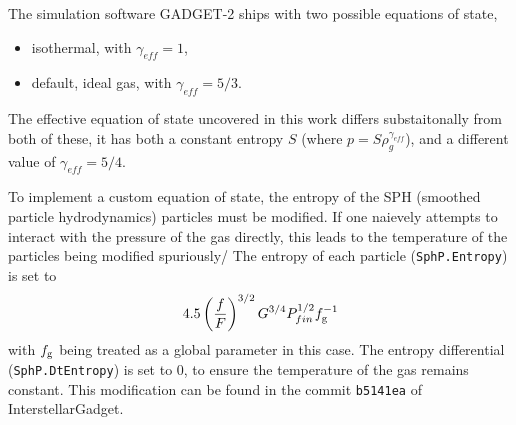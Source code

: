 The simulation software GADGET-2 ships with two possible equations of state,
\begin{itemize}
\item isothermal, with $\gamma_{eff} = 1$,
\item default, ideal gas, with $\gamma_{eff} = 5/3$.
\end{itemize}
The effective equation of state uncovered in this work differs substaitonally from both of these, it has both a constant entropy $S$ (where $p = S\rho_g^{\gamma_{eff}}$), and a different value of $\gamma_{eff} = 5/4$.

To implement a custom equation of state, the entropy of the SPH (smoothed particle hydrodynamics) particles must be modified.
If one naievely attempts to interact with the pressure of the gas directly, this leads to the temperature of the particles being modified spuriously/
The entropy of each particle ({\tt SphP.Entropy}) is set to
$$
4.5\left(\frac{f}{F}\right)^{{3/2}} G^{{3/4}} P_{fin}^{{1/2}} f_\mathrm{g}^{-1}
$$
with $f_\mathrm{g}$ being treated as a global parameter in this case.
The entropy differential ({\tt SphP.DtEntropy}) is set to 0, to ensure the temperature of the gas remains constant.
This modification can be found in the commit {\tt b5141ea} of InterstellarGadget.
